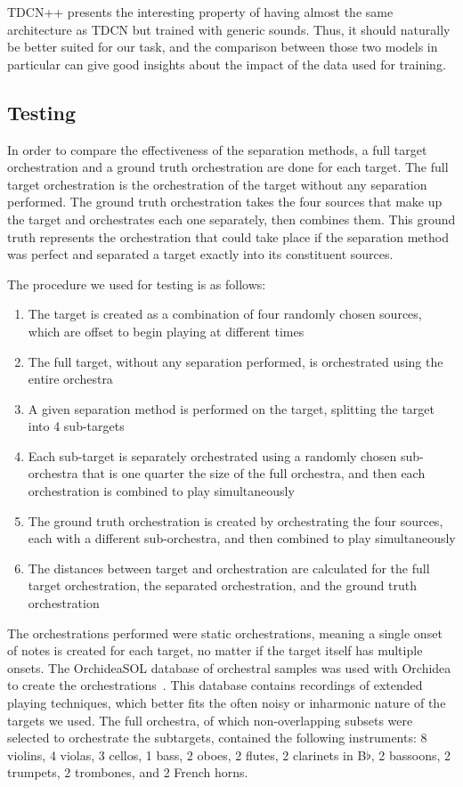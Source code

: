 \documentclass{article}
\begin{document}
			TDCN++ presents the interesting property of having almost the same architecture as TDCN but trained with generic sounds. Thus, it should naturally be better suited for our task, and the comparison between those two models in particular can give good insights about the impact of the data used for training.
	
		\subsection{Testing}
		In order to compare the effectiveness of the separation methods, a full target orchestration and a ground truth orchestration are done for each target. The full target orchestration is the orchestration of the target without any separation performed. The ground truth orchestration takes the four sources that make up the target and orchestrates each one separately, then combines them. This ground truth represents the orchestration that could take place if the separation method was perfect and separated a target exactly into its constituent sources. 
		
		The procedure we used for testing is as follows:
		\begin{enumerate}
			\item The target is created as a combination of four randomly chosen sources, which are offset to begin playing at different times
			\item The full target, without any separation performed, is orchestrated using the entire orchestra
			\item A given separation method is performed on the target, splitting the target into 4 sub-targets
			\item Each sub-target is separately orchestrated using a randomly chosen sub-orchestra that is one quarter the size of the full orchestra, and then each orchestration is combined to play simultaneously
			\item The ground truth orchestration is created by orchestrating the four sources, each with a different sub-orchestra, and then combined to play simultaneously
			\item The distances between target and orchestration are calculated for the full target orchestration, the separated orchestration, and the ground truth orchestration 
		\end{enumerate}	
		
		The orchestrations performed were static orchestrations, meaning a single onset of notes is created for each target, no matter if the target itself has multiple onsets. The OrchideaSOL database of orchestral samples was used with Orchidea to create the orchestrations~\cite{Cella2020c}. This database contains recordings of extended playing techniques, which better fits the often noisy or inharmonic nature of the targets we used. The full orchestra, of which non-overlapping subsets were selected to orchestrate the subtargets, contained the following instruments: 8 violins, 4 violas, 3 cellos, 1 bass, 2 oboes, 2 flutes, 2 clarinets in B$\flat$, 2 bassoons, 2 trumpets, 2 trombones, and 2 French horns.
		
\end{document}
